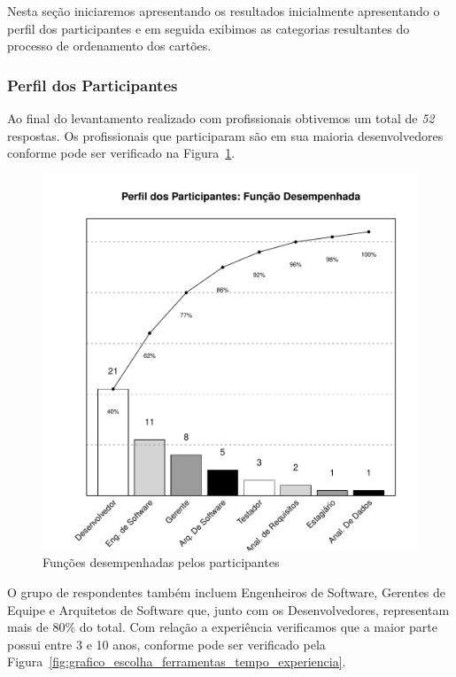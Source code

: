 Nesta seção iniciaremos apresentando os resultados inicialmente apresentando o
perfil dos participantes e em seguida exibimos as categorias resultantes do
processo de ordenamento dos cartões.

\subsubsection{Perfil dos Participantes}
\label{ssub:perfil_participantes}

Ao final do levantamento realizado com profissionais obtivemos um total de
\textit{52} respostas. Os profissionais que participaram são em sua maioria
desenvolvedores conforme pode ser verificado na
Figura~\ref{fig:grafico_escolha_ferramentas_funcao_participantes}.

\begin{figure}[htpb]
	\centering
	\includegraphics[width=0.6\linewidth]{./chapter-estudo-funcionalidades-fgrm/img/grafico_escolha_ferramentas_funcao_participantes.pdf}
	\caption{Funções desempenhadas pelos participantes}
\label{fig:grafico_escolha_ferramentas_funcao_participantes}
\end{figure}

O grupo de respondentes também incluem Engenheiros de Software, Gerentes de
Equipe e Arquitetos de Software que, junto com os Desenvolvedores, representam
mais de 80\% do total. Com relação a experiência verificamos que a maior parte
possui entre 3 e 10 anos, conforme pode ser verificado pela
Figura~\ref{fig:grafico_escolha_ferramentas_tempo_experiencia}.

